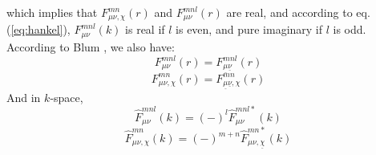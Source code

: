 \begin{enumerate}
\begin{equation}
\end{equation}
which implies that $F_{\mu\nu,\chi}^{mn}(r)$ and $F_{\mu\nu}^{mnl}(r)$
are real, and according to eq. (\ref{eq:hankel}), $F_{\mu\nu}^{mnl}(k)$
is real if $l$ is even, and pure imaginary if $l$ is odd. According
to Blum \citep{Blum_I}, we also have:
\begin{equation}
F_{\mu\nu}^{mnl}(r)=F_{\underline{\mu}\underline{\nu}}^{mnl}(r)
\end{equation}
\begin{equation}
F_{\mu\nu,\chi}^{mn}(r)=F_{\underline{\mu}\underline{\nu},\chi}^{mn}(r)
\end{equation}
And in $k$-space,
\begin{equation}
\hat{F}_{\mu\nu}^{mnl}(k)=\left(-\right)^{l}\hat{F}_{\mu\nu}^{mnl*}(k)
\end{equation}
\begin{equation}
\hat{F}_{\mu\nu,\chi}^{mn}(k)=\left(-\right)^{m+n}\hat{F}_{\mu\nu,\underline{\chi}}^{mn*}(k)
\end{equation}
\end{enumerate}

